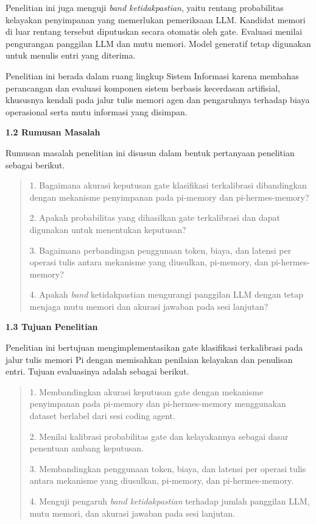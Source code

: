 \documentclass[
]{article}
\begin{document}
Penelitian ini juga menguji \emph{band ketidakpastian}, yaitu rentang probabilitas kelayakan penyimpanan yang memerlukan pemeriksaan LLM. Kandidat memori di luar rentang tersebut diputuskan secara otomatis oleh gate. Evaluasi menilai pengurangan panggilan LLM dan mutu memori. Model generatif tetap digunakan untuk menulis entri yang diterima.


Penelitian ini berada dalam ruang lingkup Sistem Informasi karena membahas perancangan dan evaluasi komponen sistem berbasis kecerdasan artifisial, khususnya kendali pada jalur tulis memori agen dan pengaruhnya terhadap biaya operasional serta mutu informasi yang disimpan.

\textbf{1.2 Rumusan Masalah}\label{sec:1.2}

Rumusan masalah penelitian ini disusun dalam bentuk pertanyaan
penelitian sebagai berikut.

\begin{quote}
1. Bagaimana akurasi keputusan gate klasifikasi terkalibrasi dibandingkan dengan mekanisme penyimpanan pada pi-memory dan pi-hermes-memory?

2. Apakah probabilitas yang dihasilkan gate terkalibrasi dan dapat digunakan untuk menentukan keputusan?

3. Bagaimana perbandingan penggunaan token, biaya, dan latensi per operasi tulis antara mekanisme yang diusulkan, pi-memory, dan pi-hermes-memory?

4. Apakah \textit{band} ketidakpastian mengurangi panggilan LLM dengan tetap menjaga mutu memori dan akurasi jawaban pada sesi lanjutan?

\end{quote}

\textbf{1.3 Tujuan Penelitian}\label{sec:1.3}

Penelitian ini bertujuan mengimplementasikan gate klasifikasi terkalibrasi
pada jalur tulis memori Pi dengan memisahkan penilaian kelayakan dan
penulisan entri. Tujuan evaluasinya adalah sebagai berikut.

\begin{quote}
1. Membandingkan akurasi keputusan gate dengan mekanisme penyimpanan
pada pi-memory dan pi-hermes-memory menggunakan dataset berlabel
dari sesi coding agent.

2. Menilai kalibrasi probabilitas gate dan kelayakannya sebagai dasar
penentuan ambang keputusan.

3. Membandingkan penggunaan token, biaya, dan latensi per operasi tulis
antara mekanisme yang diusulkan, pi-memory, dan pi-hermes-memory.

4. Menguji pengaruh \emph{band ketidakpastian} terhadap jumlah panggilan
LLM, mutu memori, dan akurasi jawaban pada sesi lanjutan.
\end{quote}
\end{document}
